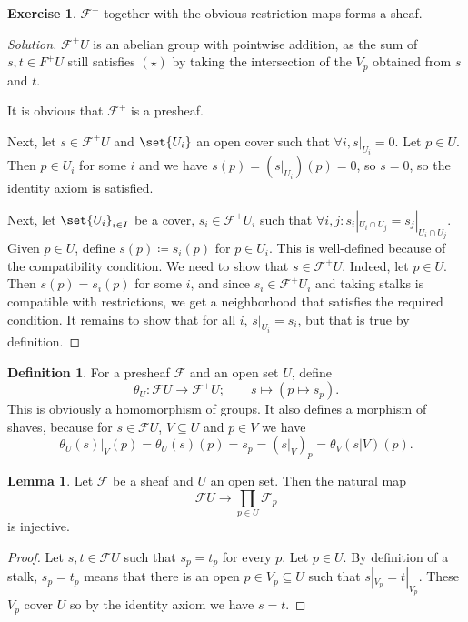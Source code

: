 \documentclass[a4paper]{amsbook}
\theoremstyle{definition}
\newtheorem*{definition*}{Definition}
\newtheorem*{lemma*}{Lemma}
\newtheorem*{exercise*}{Exercise}
\begin{document}
\begin{exercise*}
\label{AssociatedSheafIsSheaf}
$\mathcal{F}^+$ together with the obvious restriction maps forms a sheaf.
\end{exercise*}
\begin{proof}[Solution]
$\mathcal{F}^+U$ is an abelian group with pointwise addition, as the sum
of $s, t \in F^+U$ still satisfies $(\star)$ by taking the intersection of the
$V_p$ obtained from $s$ and $t$.

It is obvious that $\mathcal{F}^+$ is a presheaf.

Next, let $s \in \mathcal{F}^+U$ and $\set{U_i}$ an open cover such that
 $\forall i, s|_{U_i} = 0$. Let $p \in U$.  Then $p \in U_i$ for some $i$ and
 we have $s(p) = (s|_{U_i})(p) = 0$, so $s = 0$, so the identity axiom is satisfied.

Next, let $\set{U_i}_{i \in I}$ be a cover, $s_i \in \mathcal{F}^+U_i$ such that
$\forall i, j\colon s_i|_{U_i\cap U_j} = s_j|_{U_i\cap U_j}$. Given $p \in U$,
define $s(p)\coloneqq s_i(p)$ for $p \in U_i$. This is well-defined because of
the compatibility condition. We need to show that $s \in \mathcal{F}^+U$. Indeed,
let $p \in U$. Then $s(p) = s_i(p)$ for some $i$, and since $s_i \in \mathcal{F}^+U_i$
and taking stalks is compatible with restrictions, we get a neighborhood that
satisfies the required condition.
It remains to show that for all $i$, $s|_{U_i} = s_i$, but that is true by
definition.
\end{proof}

\begin{definition*}
\label{Inclusion}
For a presheaf $\mathcal{F}$ and an open set $U$, define
\[ \theta_U\colon \mathcal{F}U\to \mathcal{F}^+U;\qquad s\mapsto (p\mapsto s_p). \]
This is obviously a homomorphism of groups. It also defines a morphism of shaves,
because for $s \in \mathcal{F}U$, $V \subseteq U$ and $p \in V$ we have
\[ \theta_U(s)|_V(p) = \theta_U(s)(p) = s_p = (s|_V)_p =  \theta_V(s|V)(p). \]
\end{definition*}

\begin{lemma*}
\label{Lemma1}
Let $\mathcal{F}$ be a sheaf and $U$ an open set. Then the natural map
\[ \mathcal{F}U \to \prod_{p \in U} \mathcal{F}_p \]
is injective.
\end{lemma*}
\begin{proof}[Proof]
Let $s, t \in \mathcal{F}U$ such that $s_p = t_p$ for every $p$. Let $p \in U$.
By definition of a stalk, $s_p = t_p$ means that there is an open $p \in V_p \subseteq U$
such that $s|_{V_p} = t|_{V_p}$. These $V_p$ cover $U$ so by the identity axiom
we have $s = t$.
\end{proof}
\end{document}
